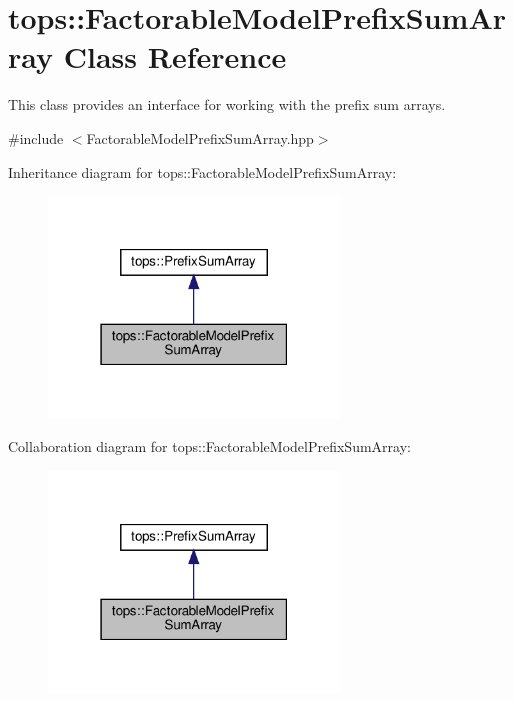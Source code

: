 \hypertarget{classtops_1_1FactorableModelPrefixSumArray}{}\section{tops\+:\+:Factorable\+Model\+Prefix\+Sum\+Array Class Reference}
\label{classtops_1_1FactorableModelPrefixSumArray}


This class provides an interface for working with the prefix sum arrays.  




{\ttfamily \#include $<$Factorable\+Model\+Prefix\+Sum\+Array.\+hpp$>$}



Inheritance diagram for tops\+:\+:Factorable\+Model\+Prefix\+Sum\+Array\+:
\nopagebreak
\begin{figure}[H]
\begin{center}
\leavevmode
\includegraphics[width=219pt]{classtops_1_1FactorableModelPrefixSumArray__inherit__graph}
\end{center}
\end{figure}


Collaboration diagram for tops\+:\+:Factorable\+Model\+Prefix\+Sum\+Array\+:
\nopagebreak
\begin{figure}[H]
\begin{center}
\leavevmode
\includegraphics[width=219pt]{classtops_1_1FactorableModelPrefixSumArray__coll__graph}
\end{center}
\end{figure}
